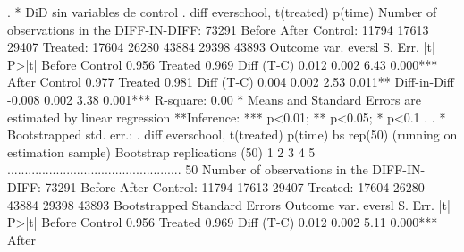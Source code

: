 . * DiD sin variables de control
. diff everschool, t(treated) p(time)
{\smallskip}
{}
Number of observations in the DIFF-IN-DIFF: 73291
            Before         After    
   Control: 11794          17613       29407
   Treated: 17604          26280       43884
            29398          43893
 Outcome var.   {\VBAR} evers{\tytilde}l {\VBAR} S. Err. {\VBAR}   |t|   {\VBAR}  P>|t|
Before          {\VBAR}         {\VBAR}         {\VBAR}         {\VBAR} 
   Control      {\VBAR} 0.956   {\VBAR}         {\VBAR}         {\VBAR} 
   Treated      {\VBAR} 0.969   {\VBAR}         {\VBAR}         {\VBAR} 
   Diff (T-C)   {\VBAR} 0.012   {\VBAR} 0.002   {\VBAR} 6.43    {\VBAR} 0.000***
After           {\VBAR}         {\VBAR}         {\VBAR}         {\VBAR} 
   Control      {\VBAR} 0.977   {\VBAR}         {\VBAR}         {\VBAR} 
   Treated      {\VBAR} 0.981   {\VBAR}         {\VBAR}         {\VBAR} 
   Diff (T-C)   {\VBAR} 0.004   {\VBAR} 0.002   {\VBAR} 2.53    {\VBAR} 0.011**
                {\VBAR}         {\VBAR}         {\VBAR}         {\VBAR} 
Diff-in-Diff    {\VBAR} -0.008  {\VBAR} 0.002   {\VBAR} 3.38    {\VBAR} 0.001***
R-square:    0.00
* Means and Standard Errors are estimated by linear regression
**Inference: *** p<0.01; ** p<0.05; * p<0.1
{\smallskip}
. 
. * Bootstrapped std. err.:
. diff everschool, t(treated) p(time) bs rep(50)
(running {} on estimation sample)
{\smallskip}
Bootstrap replications (50)
 1  2  3  4  5 
..................................................    50
{\smallskip}
{}
Number of observations in the DIFF-IN-DIFF: 73291
            Before         After    
   Control: 11794          17613       29407
   Treated: 17604          26280       43884
            29398          43893
Bootstrapped Standard Errors
{\smallskip}
 Outcome var.   {\VBAR} evers{\tytilde}l {\VBAR} S. Err. {\VBAR}   |t|   {\VBAR}  P>|t|
Before          {\VBAR}         {\VBAR}         {\VBAR}         {\VBAR} 
   Control      {\VBAR} 0.956   {\VBAR}         {\VBAR}         {\VBAR} 
   Treated      {\VBAR} 0.969   {\VBAR}         {\VBAR}         {\VBAR} 
   Diff (T-C)   {\VBAR} 0.012   {\VBAR} 0.002   {\VBAR} 5.11    {\VBAR} 0.000***
After           {\VBAR}         {\VBAR}         {\VBAR}         {\VBAR} 

